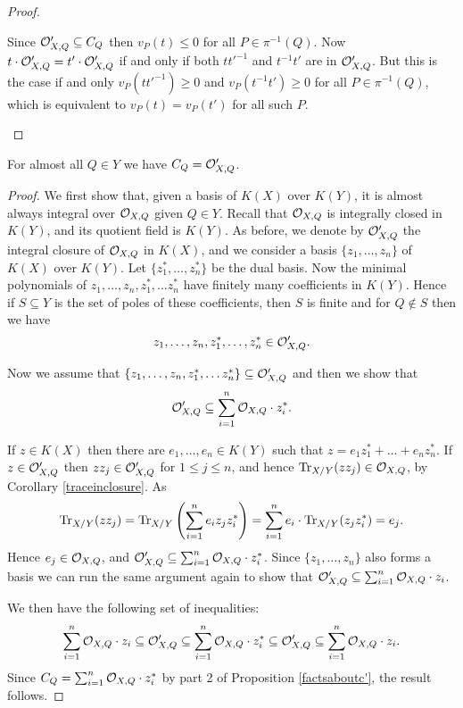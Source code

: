 \begin{proof}
\begin{enumerate}
        
        
        Since ${\cal O}_{X,Q}'\subseteq C_Q$ then $v_P(t)\leq 0$ for all $P\in \pi^{-1}(Q)$.
        Now $t\cdot {\cal O}_{X,Q}' = t'\cdot {\cal O}_{X,Q}'$ if and only if both $tt'^{-1}$ and $t^{-1}t'$ are in ${\cal O}_{X,Q}'$.
        But this is the case if and only $v_P(tt'^{-1}) \geq 0$ and $v_P(t^{-1}t')\geq 0$ for all $P\in \pi^{-1}(Q)$, which is equivalent to $v_P(t)=v_P(t')$ for all such $P$.
        \end{enumerate}
    \end{proof}

    \begin{prop}\label{almostallqiny}
    For almost all $Q\in Y$ we have $C_Q= {\cal O}_{X,Q}'$.
    \end{prop}
    \begin{proof}
    We first show that, given a basis of $K(X)$ over $K(Y)$, it is almost always integral over ${\cal O}_{X,Q}$ given $Q\in Y$.
    Recall that ${\cal O}_{X,Q}$ is integrally closed in $K(Y)$, and its quotient field is $K(Y)$.
    As before, we denote by ${\cal O}_{X,Q}'$ the integral closure of ${\cal O}_{X,Q}$ in $K(X)$, and we consider a basis $\{z_1,\ldots ,z_n\}$ of $K(X)$ over $K(Y)$.
    Let $\{z_1^*,\ldots ,z_n^*\}$ be the dual basis.
    Now the minimal polynomials of $z_1,\ldots, z_n,z_1^*,\ldots z_n^*$ have finitely many coefficients in $K(Y)$.
    Hence if $S\subseteq Y$ is the set of poles of these coefficients, then $S$ is finite and for $Q\notin S$ then we have
        \[
        z_1,\ldots,z_n,z_1^*,\ldots, z_n^*\in {\cal O}_{X,Q}'.
        \]
    
    Now we assume that $\{z_1,\ldots ,z_n,z_1^*,\ldots z_n^*\}\subseteq {\cal O}_{X,Q}'$ and then we show that 
        \[
        {\cal O}_{X,Q}' \subseteq \sum_{i=1}^n {\cal O}_{X,Q}\cdot z_i^*.
        \]
    
    If $z\in K(X)$ then there are $e_1,\ldots, e_n\in K(Y)$ such that $z=e_1z_1^*+\ldots +e_nz_n^*$.
    If $z\in {\cal O}_{X,Q}'$ then $zz_j\in {\cal O}_{X,Q}'$ for $1\leq j\leq n$, and hence $\operatorname{Tr}_{X/Y}(zz_j)\in {\cal O}_{X,Q}$, by Corollary \ref{traceinclosure}.
    As
        \[
        \operatorname{Tr}_{X/Y}(zz_j) = \operatorname{Tr}_{X/Y}\left(\sum_{i=1}^n e_iz_jz_i^*\right) = \sum_{i=1}^ne_i\cdot \operatorname{Tr}_{X/Y}(z_jz_i^*) = e_j.
        \]
    Hence $e_j\in {\cal O}_{X,Q}$, and ${\cal O}_{X,Q}'\subseteq \sum_{i=1}^n{\cal O}_{X,Q}\cdot z_i^*$.
    Since $\{z_1,\ldots, z_n\}$ also forms a basis we can run the same argument again to show that ${\cal O}_{X,Q}'\subseteq \sum_{i=1}^n{\cal O}_{X,Q}\cdot z_i$.
    
    We then have the following set of inequalities:
        \[
        \sum_{i=1}^n {\cal O}_{X,Q}\cdot z_i \subseteq {\cal O}_{X,Q}' \subseteq \sum_{i=1}^n{\cal O}_{X,Q}\cdot z_i^* \subseteq {\cal O}_{X,Q}'\subseteq \sum_{i=1}^n {\cal O}_{X,Q}\cdot z_i.
        \]
    Since $C_Q = \sum_{i=1}^n {\cal O}_{X,Q}\cdot z_i^*$ by part 2 of Proposition \ref{factsaboutc'}, the result follows.
    \end{proof}

